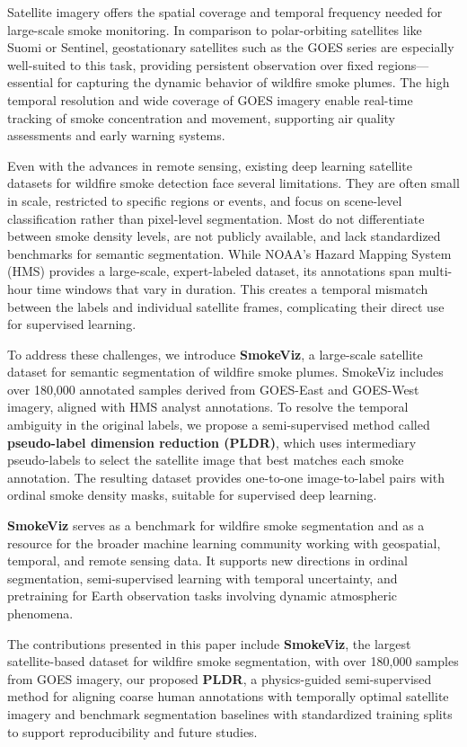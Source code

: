 \documentclass{article}
\begin{document}
Satellite imagery offers the spatial coverage and temporal frequency needed for large-scale smoke monitoring. In comparison to polar-orbiting satellites like Suomi or Sentinel, geostationary satellites such as the GOES series \cite{goes} are especially well-suited to this task, providing persistent observation over fixed regions—essential for capturing the dynamic behavior of wildfire smoke plumes. The high temporal resolution and wide coverage of GOES imagery enable real-time tracking of smoke concentration and movement, supporting air quality assessments and early warning systems.

Even with the advances in remote sensing, existing deep learning satellite datasets for wildfire smoke detection face several limitations. They are often small in scale, restricted to specific regions or events, and focus on scene-level classification rather than pixel-level segmentation. Most do not differentiate between smoke density levels, are not publicly available, and lack standardized benchmarks for semantic segmentation. While NOAA’s Hazard Mapping System (HMS) provides a large-scale, expert-labeled dataset, its annotations span multi-hour time windows that vary in duration. This creates a temporal mismatch between the labels and individual satellite frames, complicating their direct use for supervised learning.

To address these challenges, we introduce \textbf{SmokeViz}, a large-scale satellite dataset for semantic segmentation of wildfire smoke plumes. SmokeViz includes over 180,000 annotated samples derived from GOES-East and GOES-West imagery, aligned with HMS analyst annotations. To resolve the temporal ambiguity in the original labels, we propose a semi-supervised method called \textbf{pseudo-label dimension reduction (PLDR)}, which uses intermediary pseudo-labels to select the satellite image that best matches each smoke annotation. The resulting dataset provides one-to-one image-to-label pairs with ordinal smoke density masks, suitable for supervised deep learning.

\textbf{SmokeViz} serves as a benchmark for wildfire smoke segmentation and as a resource for the broader machine learning community working with geospatial, temporal, and remote sensing data. It supports new directions in ordinal segmentation, semi-supervised learning with temporal uncertainty, and pretraining for Earth observation tasks involving dynamic atmospheric phenomena.

The contributions presented in this paper include \textbf{SmokeViz}, the largest satellite-based dataset for wildfire smoke segmentation, with over 180,000 samples from GOES imagery, our proposed \textbf{PLDR}, a physics-guided semi-supervised method for aligning coarse human annotations with temporally optimal satellite imagery and benchmark segmentation baselines with standardized training splits to support reproducibility and future studies.
\end{document}
